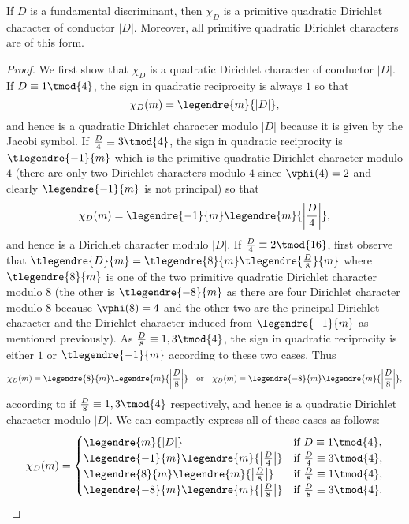       \begin{theorem}\label{thm:fundamental_discriminant_character_primitive}
        If $D$ is a fundamental discriminant, then $\chi_{D}$ is a primitive quadratic Dirichlet character of conductor $|D|$. Moreover, all primitive quadratic Dirichlet characters are of this form.
      \end{theorem}
      \begin{proof}
        We first show that $\chi_{D}$ is a quadratic Dirichlet character of conductor $|D|$. If $D \equiv 1 \tmod{4}$, the sign in quadratic reciprocity is always $1$ so that
        \[
          \chi_{D}(m) = \legendre{m}{|D|},
        \]
        and hence is a quadratic Dirichlet character modulo $|D|$ because it is given by the Jacobi symbol. If $\frac{D}{4} \equiv 3 \tmod{4}$, the sign in quadratic reciprocity is $\tlegendre{-1}{m}$ which is the primitive quadratic Dirichlet character modulo $4$ (there are only two Dirichlet characters modulo $4$ since $\vphi(4) = 2$ and clearly $\legendre{-1}{m}$ is not principal) so that
        \[
          \chi_{D}(m) = \legendre{-1}{m}\legendre{m}{\left|\frac{D}{4}\right|},
        \]
        and hence is a Dirichlet character modulo $|D|$. If $\frac{D}{4} \equiv 2 \tmod{16}$, first observe that $\tlegendre{D}{m} = \tlegendre{8}{m}\tlegendre{\frac{D}{8}}{m}$ where $\tlegendre{8}{m}$ is one of the two primitive quadratic Dirichlet character modulo $8$ (the other is $\tlegendre{-8}{m}$ as there are four Dirichlet character modulo $8$ because $\vphi(8) = 4$ and the other two are the principal Dirichlet character and the Dirichlet character induced from $\legendre{-1}{m}$ as mentioned previously). As $\frac{D}{8} \equiv 1,3 \tmod{4}$, the sign in quadratic reciprocity is either $1$ or $\tlegendre{-1}{m}$ according to these two cases. Thus
        \[
          \chi_{D}(m) = \legendre{8}{m}\legendre{m}{\left|\frac{D}{8}\right|} \quad \text{or} \quad \chi_{D}(m) = \legendre{-8}{m}\legendre{m}{\left|\frac{D}{8}\right|},
        \]
        according to if $\frac{D}{8} \equiv 1,3 \tmod{4}$ respectively, and hence is a quadratic Dirichlet character modulo $|D|$. We can compactly express all of these cases as follows:
        \[
          \chi_{D}(m) = \begin{cases} \legendre{m}{|D|} & \text{if $D \equiv 1 \tmod{4}$}, \\ \legendre{-1}{m}\legendre{m}{\left|\frac{D}{4}\right|} & \text{if $\frac{D}{4} \equiv 3 \tmod{4}$}, \\ \legendre{8}{m}\legendre{m}{\left|\frac{D}{8}\right|} & \text{if $\frac{D}{8} \equiv 1 \tmod{4}$}, \\ \legendre{-8}{m}\legendre{m}{\left|\frac{D}{8}\right|} & \text{if $\frac{D}{8} \equiv 3 \tmod{4}$}. \end{cases}
\]
\end{proof}
